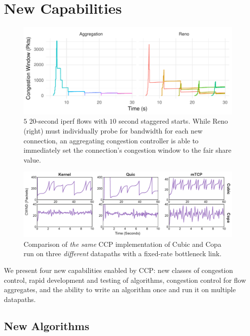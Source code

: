 \section{New Capabilities}
\label{s:capabilities}

\begin{figure}
    \centering
    \includegraphics[width=\columnwidth]{img/stair}
    \caption{$5$ 20-second iperf flows with $10$ second staggered starts. While Reno (right) must individually probe for bandwidth for each new connection, an aggregating congestion controller is able to immediately set the connection's congestion window to the fair share value.}
    \label{fig:cap:agg}
\end{figure}
\begin{figure}[t!]
    \centering
    \includegraphics[width=2\columnwidth]{img/datapath-compare.pdf}
    \caption{Comparison of \textit{the same} CCP implementation of Cubic and Copa run on three \textit{different} datapaths with a fixed-rate bottleneck link. %
    }\label{fig:datapaths:wora}
\end{figure}

We present four new capabilities enabled by CCP: new classes of congestion control, rapid development and testing of algorithms, congestion control for flow aggregates, and the ability to write an algorithm once and run it on multiple datapaths.

\subsection{New Algorithms}
\label{s:capabilities:algs}

